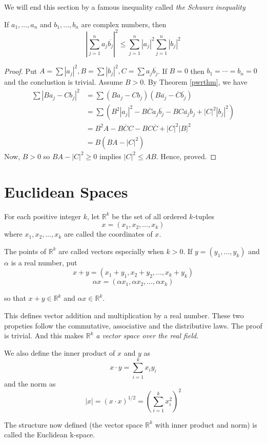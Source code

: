 We will end this section by a famous inequality called {\it the Schwarz inequality}

\begin{thm}
	If $a_1, \dots, a_n$ and $b_1, \dots, b_n$ are complex numbers, then
	$$
		\left| \sum_{j=1}^n a_j \overline{b_j} \right| ^ 2
		\leq
		\sum_{j=1}^n |a_j|^2 \sum_{j=1}^n |b_j|^2
	$$
	\begin{proof}
		Put $A = \sum |a_j|^2, B = \sum |b_j|^2, C = \sum a_j \overline{b_j}$.
		If $B = 0$ then $b_1 = \cdots = b_n = 0$ and the conclustion is trivial.
		Assume $B > 0$. By Theorem \ref{pwrthm}, we have
		\begin{align*}
			\sum |B a_j - C b_j|^2
				& = \sum (B a_j - C b_j)(B \overline{a_j} - \overline{C} \overline{b_j}) \\
				& = \sum ( B^2 |a_j|^2
					- B \overline{C} a_j \overline{b_j}
					- B C \overline{a_j} b_j
					+ |C|^2 |b_j|^2 ) \\
				& = B^2 A - B \overline{C} C - B C \overline{C} + |C|^2 |B|^2 \\
				& = B (BA - |C|^2)
		\end{align*}
		Now, $B > 0$ so $BA - |C|^2 \geq 0$ implies $|C|^2 \leq AB$.
		Hence, proved.
	\end{proof}
\end{thm}


\section{Euclidean Spaces}

\begin{defn}
	For each positive integer $k$, let $\mathbb{R}^k$ be the set of all ordered $k$-tuples
	$$ x = (x_1, x_2, \dots, x_k) $$
	where $x_1, x_2, \dots, x_k$ are called the coordinates of $x$.

The points of $\mathbb{R}^k$ are called vectors especially when $k > 0$.
If $y = (y_1, \dots, y_k)$ and $\alpha$ is a real number, put
$$ x + y = (x_1 + y_1, x_2 + y_2, \dots, x_k + y_k) $$
$$ \alpha x = (\alpha x_1, \alpha x_2, \dots, \alpha x_k) $$

so that $x + y \in \mathbb{R}^k$ and $\alpha x \in \mathbb{R}^k$.

This defines vector addition and multiplication by a real number.
These two propeties follow the commutative, associative and the distributive laws.
The proof is trivial. And this makes $\mathbb{R}^k$ {\it a vector space over the real field}.

We also define the inner product of $x$ and $y$ as
$$
x \cdot y = \sum_{i=1}^k x_i y_i
$$
and the norm as
$$
|x| = (x \cdot x)^{1/2} = \left( \sum_{i=1}^k x_i^2 \right)^2
$$

The structure now defined (the vector space $\mathbb{R}^k$ with inner product and norm)
is called the Euclidean k-space.
\end{defn}

